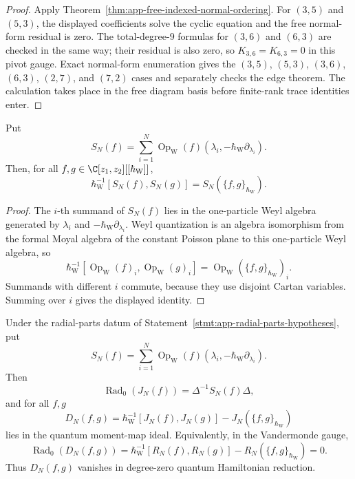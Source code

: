\begin{proof}
  Apply Theorem~\ref{thm:app-free-indexed-normal-ordering}.  For
  \((3,5)\) and \((5,3)\), the displayed coefficients solve the cyclic
  equation and the free normal-form residual is zero.  The
  total-degree-\(9\) formulas for \((3,6)\) and \((6,3)\) are checked in
  the same way; their residual is also zero, so \(K_{3,6}=K_{6,3}=0\)
  in this pivot gauge.  Exact normal-form enumeration gives the
  \((3,5)\), \((5,3)\), \((3,6)\), \((6,3)\), \((2,7)\), and \((7,2)\)
  cases and separately checks the edge theorem.
  The calculation takes place in the free diagram basis before
  finite-rank trace identities enter.
\end{proof}

\begin{lem}
\label{lem:app-radial-cartan-moyal-representation}
  Put
  \[
    S_N(f)=\sum_{i=1}^N
      \operatorname{Op}_{\mathrm W}
      (f)(\lambda_i,-\hbar_{\mathrm{W}}\partial_{\lambda_i}).
  \]
  Then, for all \(f,g\in\C[z_1,z_2][[\hbar_{\mathrm{W}}]]\),
  \[
    \hbar_{\mathrm{W}}^{-1}[S_N(f),S_N(g)]=S_N(\{f,g\}_{\hbar_{\mathrm{W}}}).
  \]
\end{lem}

\begin{proof}
  The \(i\)-th summand of \(S_N(f)\) lies in the one-particle Weyl
  algebra generated by \(\lambda_i\) and
  \(-\hbar_{\mathrm{W}}\partial_{\lambda_i}\).  Weyl quantization is an algebra
  isomorphism from the formal Moyal algebra of the constant Poisson
  plane to this one-particle Weyl algebra, so
  \[
    \hbar_{\mathrm{W}}^{-1}[
      \operatorname{Op}_{\mathrm W}(f)_i,
      \operatorname{Op}_{\mathrm W}(g)_i]
    =
    \operatorname{Op}_{\mathrm W}(\{f,g\}_{\hbar_{\mathrm{W}}})_i .
  \]
  Summands with different \(i\) commute, because they use disjoint
  Cartan variables.  Summing over \(i\) gives the displayed identity.
\end{proof}

\begin{thm}
\label{thm:app-radial-finite-N}
  Under the radial-parts datum of
  Statement~\ref{stmt:app-radial-parts-hypotheses}, put
  \[
    S_N(f)=\sum_{i=1}^N
      \operatorname{Op}_{\mathrm W}
      (f)(\lambda_i,-\hbar_{\mathrm{W}}\partial_{\lambda_i}).
  \]
  Then
  \[
    \operatorname{Rad}_0(J_N(f))=\Delta^{-1}S_N(f)\Delta,
  \]
  and for all \(f,g\)
  \[
    D_N(f,g)=
      \hbar_{\mathrm{W}}^{-1}[J_N(f),J_N(g)]-J_N(\{f,g\}_{\hbar_{\mathrm{W}}})
  \]
  lies in the quantum moment-map ideal.  Equivalently, in the
  Vandermonde gauge,
  \[
    \operatorname{Rad}_0(D_N(f,g))
      =
      \hbar_{\mathrm{W}}^{-1}[R_N(f),R_N(g)]-R_N(\{f,g\}_{\hbar_{\mathrm{W}}})
      =0 .
  \]
  Thus \(D_N(f,g)\) vanishes in degree-zero quantum Hamiltonian
  reduction.
\end{thm}

